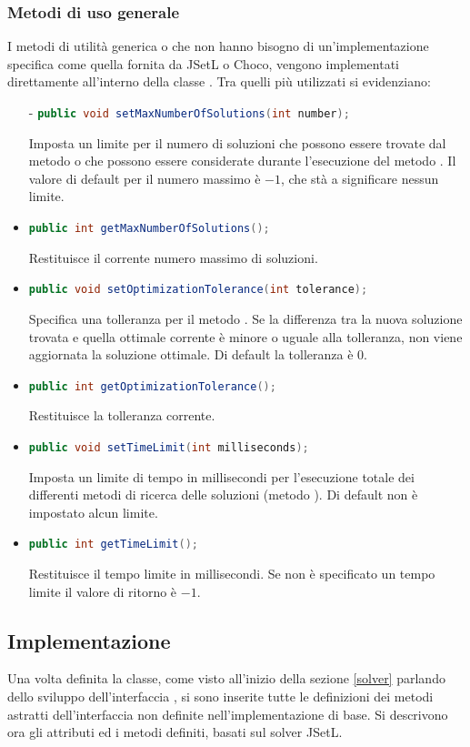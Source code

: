\subsubsection{Metodi di uso generale}
I metodi di utilità generica o che non hanno bisogno di un'implementazione 
specifica
come quella fornita da JSetL o Choco, vengono implementati direttamente
all'interno della classe . Tra quelli più utilizzati
si evidenziano:
\begin{itemize}
\item[-]\lstinline[language = Java]$public void setMaxNumberOfSolutions(int number);$ 

Imposta un limite per il numero di soluzioni che possono essere trovate dal
metodo  o che possono essere considerate durante 
l'esecuzione del metodo . Il valore di default
per il numero massimo è $-1$, che stà a significare nessun limite.
\item[-]\lstinline[language = Java]$public int getMaxNumberOfSolutions();$

Restituisce il corrente numero massimo di soluzioni. 
\item[-]\lstinline[language = Java]$public void setOptimizationTolerance(int tolerance);$ 

Specifica una tolleranza per il metodo . Se la
differenza tra la nuova soluzione trovata e quella ottimale corrente è minore
o uguale alla tolleranza, non viene aggiornata la soluzione ottimale. Di
default la tolleranza è $0$.
\item[-]\lstinline[language = Java]$public int getOptimizationTolerance();$ 

Restituisce la tolleranza corrente. 
\item[-]\lstinline[language = Java]$public void setTimeLimit(int milliseconds);$

Imposta un limite di tempo in millisecondi per l'esecuzione totale dei
differenti metodi di ricerca delle soluzioni (metodo ). Di default 
non è impostato alcun limite.
\item[-]\lstinline[language = Java]$public int getTimeLimit();$ 

Restituisce il tempo limite in millisecondi. Se non è specificato un tempo
limite il valore di ritorno è $-1$.
\end{itemize}

\subsection{Implementazione}
Una volta definita la classe, come visto all'inizio 
della sezione \ref{solver} parlando dello sviluppo dell'interfaccia 
, si sono inserite tutte le definizioni dei metodi astratti
dell'interfaccia  non definite nell'implementazione di base. 
Si descrivono ora gli attributi ed i metodi definiti, basati sul solver JSetL.

